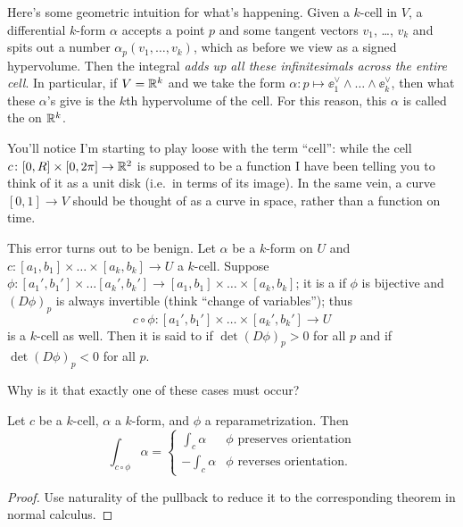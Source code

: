 Here's some geometric intuition for what's happening.
Given a $k$-cell in $V$, a differential $k$-form $\alpha$ accepts a point $p$ and some tangent vectors $v_1$, \dots, $v_k$
and spits out a number $\alpha_p(v_1, \dots, v_k)$,
which as before we view as a signed hypervolume.
Then the integral \emph{adds up all these infinitesimals across the entire cell}.
In particular, if $V = \mathbb R^k$ and we take the form $\alpha \colon p \mapsto \ee_1^\vee \wedge \dots \wedge \ee_k^\vee$,
then what these $\alpha$'s give is the $k$th hypervolume of the cell.
For this reason, this $\alpha$ is called the  on $\mathbb R^k$.

You'll notice I'm starting to play loose with the term ``cell'':
while the cell $c \colon [0,R] \times [0,2\pi] \to \mathbb R^2$ is supposed to be a function
I have been telling you to think of it as a unit disk (i.e.\ in terms of its image).
In the same vein, a curve $[0,1] \to V$ should be thought of as a curve in space,
rather than a function on time.

This error turns out to be benign.
Let $\alpha$ be a $k$-form on $U$ and $c \colon [a_1, b_1] \times \dots \times [a_k, b_k] \to U$ a $k$-cell.
Suppose $\phi \colon [a_1', b_1'] \times \dots [a_k', b_k'] \to [a_1, b_1] \times \dots \times [a_k, b_k]$;
it is a  if $\phi$ is bijective and $(D\phi)_p$ is always invertible
(think ``change of variables'');
thus
\[ c \circ \phi \colon [a_1', b_1'] \times \dots \times [a_k',b_k'] \to U \]
is a $k$-cell as well.
Then it is said to  if $\det(D\phi)_p > 0$ for all $p$
and  if $\det(D\phi)_p < 0$ for all $p$.
\begin{exercise}
	Why is it that exactly one of these cases must occur?
\end{exercise}

\begin{theorem}
	Let $c$ be a $k$-cell, $\alpha$ a $k$-form, and $\phi$ a reparametrization.
	Then
	\[ \int_{c \circ \phi} \alpha
		=
		\begin{cases}
			\int_c \alpha & \phi \text{ preserves orientation} \\
			- \int_c \alpha & \phi \text{ reverses orientation}.
		\end{cases}
	\]
\end{theorem}
\begin{proof}
	Use naturality of the pullback to reduce it to the corresponding
	theorem in normal calculus.
\end{proof}


